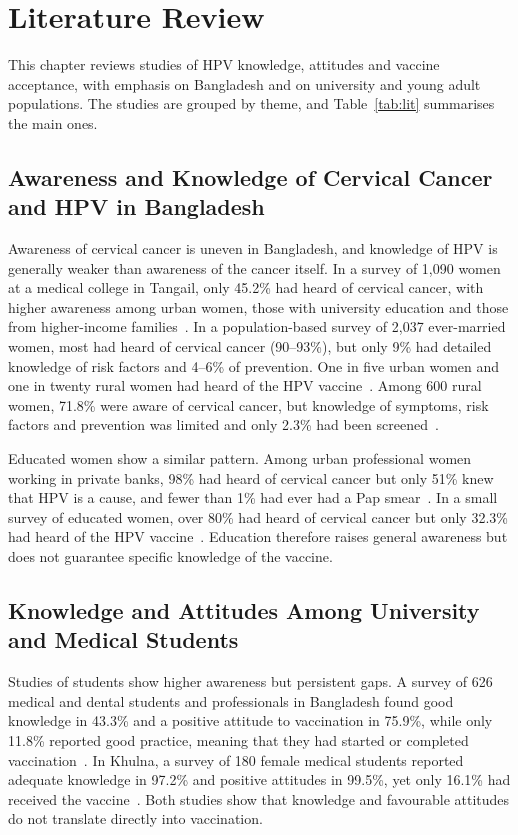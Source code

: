 \chapter{Literature Review}

This chapter reviews studies of HPV knowledge, attitudes and vaccine acceptance, with emphasis on Bangladesh and on university and young adult populations. The studies are grouped by theme, and Table~\ref{tab:lit} summarises the main ones.

\section{Awareness and Knowledge of Cervical Cancer and HPV in Bangladesh}
Awareness of cervical cancer is uneven in Bangladesh, and knowledge of HPV is generally weaker than awareness of the cancer itself. In a survey of 1,090 women at a medical college in Tangail, only 45.2\% had heard of cervical cancer, with higher awareness among urban women, those with university education and those from higher-income families~\cite{alam2022}. In a population-based survey of 2,037 ever-married women, most had heard of cervical cancer (90--93\%), but only 9\% had detailed knowledge of risk factors and 4--6\% of prevention. One in five urban women and one in twenty rural women had heard of the HPV vaccine~\cite{islam2018}. Among 600 rural women, 71.8\% were aware of cervical cancer, but knowledge of symptoms, risk factors and prevention was limited and only 2.3\% had been screened~\cite{banik2022}.

Educated women show a similar pattern. Among urban professional women working in private banks, 98\% had heard of cervical cancer but only 51\% knew that HPV is a cause, and fewer than 1\% had ever had a Pap smear~\cite{bhuiyan2018}. In a small survey of educated women, over 80\% had heard of cervical cancer but only 32.3\% had heard of the HPV vaccine~\cite{taniya2023}. Education therefore raises general awareness but does not guarantee specific knowledge of the vaccine.

\section{Knowledge and Attitudes Among University and Medical Students}
Studies of students show higher awareness but persistent gaps. A survey of 626 medical and dental students and professionals in Bangladesh found good knowledge in 43.3\% and a positive attitude to vaccination in 75.9\%, while only 11.8\% reported good practice, meaning that they had started or completed vaccination~\cite{chowdhury2022}. In Khulna, a survey of 180 female medical students reported adequate knowledge in 97.2\% and positive attitudes in 99.5\%, yet only 16.1\% had received the vaccine~\cite{promi2025}. Both studies show that knowledge and favourable attitudes do not translate directly into vaccination.

